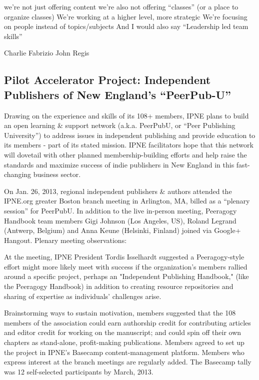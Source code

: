 \documentclass{acm_proc_article-sp}
\begin{document}
we're not just offering content
we're also not offering ``classes'' (or a place to organize classes)
We're working at a higher level, more strategic
We're focusing on people instead of topics/subjects
And I would also say ``Leadership led team skills''

Charlie
Fabrizio
John
Regis

\subsection{Pilot Accelerator Project: Independent Publishers of New England’s “PeerPub-U”}

Drawing on the experience and skills of its 108+ members, IPNE plans to build an open learning \& support network (a.k.a. PeerPubU, or “Peer Publishing University”) to address issues in independent publishing and provide education to its members - part of its stated mission. IPNE facilitators hope that this network will dovetail with other planned membership-building efforts and help raise the standards and maximize success of indie publishers in New England in this fast-changing business sector.

On Jan. 26, 2013, regional independent publishers \& authors attended the IPNE.org greater Boston branch meeting in Arlington, MA, billed as a “plenary session” for PeerPubU. In addition to the live in-person meeting, Peeragogy Handbook team members Gigi Johnson (Los Angeles, US), Roland Legrand (Antwerp, Belgium) and Anna Keune (Helsinki, Finland) joined via Google+ Hangout.
Plenary meeting observations:

At the meeting, IPNE President Tordis Isselhardt suggested a Peeragogy-style effort might more likely meet with success if the organization's members rallied around a specific project, perhaps an "Independent Publishing Handbook," (like the Peeragogy Handbook) in addition to creating resource repositories and sharing of expertise as individuals’ challenges arise.

Brainstorming ways to sustain motivation, members suggested that the 108 members of the association could earn authorship credit for contributing articles and editor credit for working on the manuscript; and could spin off their own chapters as stand-alone, profit-making publications.
Members agreed to set up the project in IPNE’s Basecamp content-management platform. Members who express interest at the branch meetings are regularly added. The Basecamp tally was 12 self-selected participants by March, 2013. 
\end{document}

